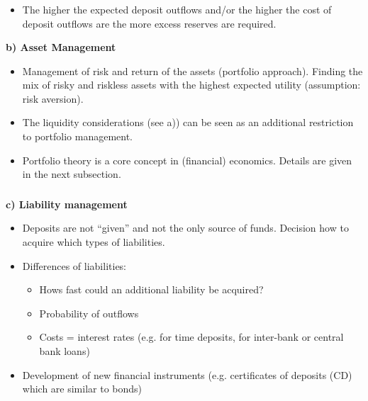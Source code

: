 \documentclass[11pt]{beamer}
\begin{document}
\begin{frame}
\frametitle{\insertsection}

\begin{itemize}
\item The higher the expected deposit outflows  and/or the higher the cost of deposit outflows are the more excess reserves are required.
\end{itemize}
\par\medskip

\textbf{b) Asset Management }

\begin{itemize}
\item Management of risk and return of the assets (portfolio approach). Finding the mix of risky and riskless assets with the highest expected utility (assumption: risk aversion).

\item The liquidity considerations (see a)) can be seen as an additional restriction to portfolio management.

\item Portfolio theory is a core concept in (financial) economics. Details are given in the next subsection.
\end{itemize}
\end{frame}


\begin{frame}
\frametitle{\insertsection}

\textbf{c) Liability management}

\begin{itemize}
\item Deposits are not ``given'' and not the only source of funds. Decision how to acquire which types of liabilities.

\item Differences of liabilities:
\begin{itemize}
\item Hows fast could an additional liability be acquired?
\item Probability of outflows
\item Costs = interest rates (e.g. for time deposits, for inter-bank or central bank loans)
\end{itemize}

\item Development of new financial instruments (e.g. certificates of deposits (CD) which are similar to bonds)
\end{itemize}

\end{frame}
\end{document}
